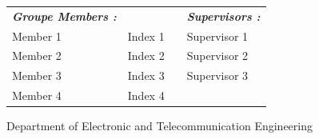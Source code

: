 \documentclass[12pt,a4paper,margin=1in]{article}
\begin{document}
\begin{titlepage}
\fontsize{12pt}{12}\selectfont
\begin{tabular}{ l l l l}
\textbf{\textit{Groupe Members :}} & & & \textbf{\textit{Supervisors :}}\\[3pt]
\hspace{5mm}Member 1 & Index 1 & \hspace{20mm} & \hspace{5mm}Supervisor 1\\[2pt]
\hspace{5mm}Member 2 & Index 2 & \hspace{20mm} & \hspace{5mm}Supervisor 2\\[2pt]
\hspace{5mm}Member 3 & Index 3 & \hspace{20mm} & \hspace{5mm}Supervisor 3\\[2pt]
\hspace{5mm}Member 4 & Index 4 & \hspace{20mm} &    
\end{tabular}

\vspace{2cm}
\fontsize{16pt}{12}\selectfont Department of Electronic and Telecommunication Engineering\\[1cm]


\vfill %

\end{titlepage}
\end{document}
